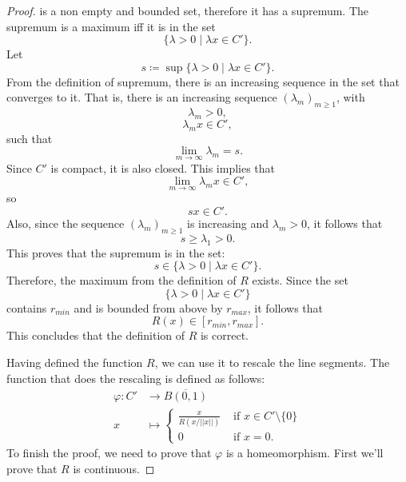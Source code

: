 \documentclass[10pt,a4paper]{amsart}
\begin{document}
\begin{proof}
	is a non empty and bounded set, therefore it has a supremum. The supremum is a maximum iff it is in the set
	\begin{equation*}
		\{\lambda > 0 \mid \lambda x \in C' \}.
	\end{equation*}
	Let
	\begin{equation}
		s \coloneqq \sup \{\lambda > 0 \mid \lambda x \in C' \}.
	\end{equation}
	From the definition of supremum, there is an increasing sequence in the set that converges to it. That is, there is an increasing sequence $(\lambda_m)_{m \geq 1}$, with
	\begin{equation}
		\lambda_m > 0,
	\end{equation}
	\begin{equation}
		\lambda_m x \in C',
	\end{equation}
	such that
	\begin{equation}
		\lim_{m \to \infty} \lambda_m = s.
	\end{equation}
	Since $C'$ is compact, it is also closed. This implies that
	\begin{equation}
		\lim_{m \to \infty} \lambda_m x \in C',
	\end{equation}
	so
	\begin{equation}
		s x \in C'.
	\end{equation}
	Also, since the sequence $(\lambda_m)_{m \geq 1}$ is increasing and $\lambda_m > 0$, it follows that
	\begin{equation}
		s \geq \lambda_1 > 0.
	\end{equation}
	This proves that the supremum is in the set:
	\begin{equation}
		s \in \{\lambda > 0 \mid \lambda x \in C' \}.
	\end{equation}
	Therefore, the maximum from the definition of $R$ exists. Since the set
	\begin{equation*}
		\{\lambda > 0 \mid \lambda x \in C' \}
	\end{equation*}
	contains $r_{min}$ and is bounded from above by $r_{max}$, it follows that
	\begin{equation}
		\label{equation: R bounds}
		R(x) \in [r_{min}, r_{max}].
	\end{equation}
	This concludes that the definition of $R$ is correct.
	
	Having defined the function $R$, we can use it to rescale the line segments. The function that does the rescaling is defined as follows:
	\begin{align*}
		\varphi \colon C' &\longrightarrow \overline{B(0,1)}\\
		x &\longmapsto \begin{cases}
			\frac{x}{R(x/||x||)} &\text{ if } x \in C' \setminus \{0\}\\
			0 &\text{ if } x=0.
		\end{cases}
	\end{align*}
	To finish the proof, we need to prove that $\varphi$ is a homeomorphism. First we'll prove that $R$ is continuous.
	

\end{proof}
\end{document}
